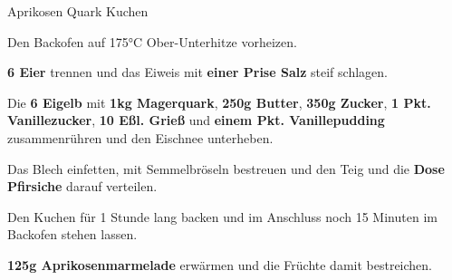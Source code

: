 \begin{recipe}[]{Aprikosen Quark Kuchen} %

\step
Den Backofen auf 175°C Ober-Unterhitze vorheizen.

\step
\textbf{6 Eier} trennen und das Eiweis mit \textbf{einer Prise Salz} steif schlagen.

\step
Die \textbf{6 Eigelb} mit \textbf{1kg Magerquark}, \textbf{250g Butter}, \textbf{350g Zucker}, \textbf{1 Pkt. Vanillezucker}, \textbf{10 Eßl. Grieß} und \textbf{einem Pkt. Vanillepudding} zusammenrühren und den Eischnee unterheben.

\step
Das Blech einfetten, mit Semmelbröseln bestreuen und den Teig und die \textbf{Dose Pfirsiche} darauf verteilen.  

\step
Den Kuchen für 1 Stunde lang backen und im Anschluss noch 15 Minuten im Backofen stehen lassen.

\step
\textbf{125g Aprikosenmarmelade} erwärmen und die Früchte damit bestreichen.

\end{recipe}